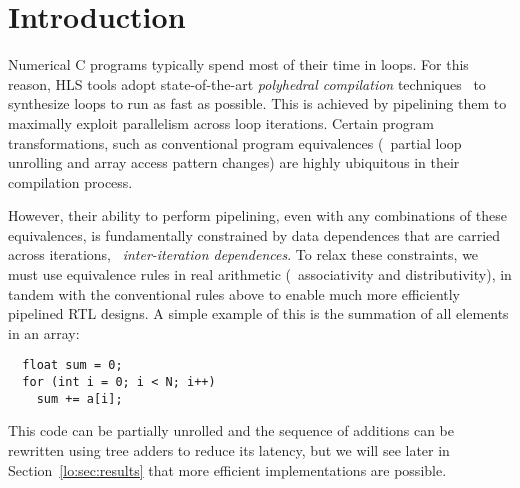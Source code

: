 \section{Introduction}
\label{lo:sec:introduction}


Numerical C programs typically spend most of their time in loops.  For this
reason, HLS tools adopt state-of-the-art \emph{polyhedral compilation}
techniques~\cite{canis14} to synthesize loops to run as fast as possible.  This
is achieved by pipelining them to maximally exploit parallelism across loop
iterations.  Certain program transformations, such as conventional program
equivalences (\eg~partial loop unrolling and array access pattern changes) are
highly ubiquitous in their compilation process.

However, their ability to perform pipelining, even with any combinations of
these equivalences, is fundamentally constrained by data dependences that
are carried across iterations, \ie~\emph{inter-iteration dependences}.  To
relax these constraints, we must use equivalence rules in real arithmetic
(\eg~associativity and distributivity), in tandem with the conventional rules
above to enable much more efficiently pipelined RTL designs.  A simple example
of this is the summation of all elements in an array:
\begin{lstlisting}
  float sum = 0;
  for (int i = 0; i < N; i++)
    sum += a[i];
\end{lstlisting}
This code can be partially unrolled and the sequence of additions can be
rewritten using tree adders to reduce its latency, but we will see later in
Section~\ref{lo:sec:results} that more efficient implementations are possible.


